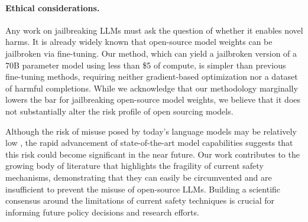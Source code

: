 \documentclass{article}
\begin{document}
\paragraph{Ethical considerations.}
Any work on jailbreaking LLMs must ask the question of whether it enables novel harms.
It is already widely known that open-source model weights can be jailbroken via fine-tuning.
Our method, which can yield a jailbroken version of a 70B parameter model using less than \$5 of compute, is simpler than previous fine-tuning methods, requiring neither gradient-based optimization nor a dataset of harmful completions.
While we acknowledge that our methodology marginally lowers the bar for jailbreaking open-source model weights, we believe that it does not substantially alter the risk profile of open sourcing models.

Although the risk of misuse posed by today's language models may be relatively low \citep{anthropic2023responsible, mouton2024operational}, the rapid advancement of state-of-the-art model capabilities suggests that this risk could become significant in the near future.
Our work contributes to the growing body of literature that highlights the fragility of current safety mechanisms, demonstrating that they can easily be circumvented and are insufficient to prevent the misuse of open-source LLMs.
Building a scientific consensus around the limitations of current safety techniques is crucial for informing future policy decisions and research efforts.
\end{document}
